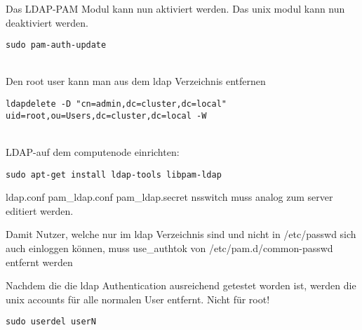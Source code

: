 Das LDAP-PAM Modul kann nun aktiviert werden. Das unix modul kann nun deaktiviert werden.
\begin{lstlisting}[style=Bash]
sudo pam-auth-update
\end{lstlisting}
\\
Den root user kann man aus dem ldap Verzeichnis entfernen
\begin{lstlisting}[style=Bash]
ldapdelete -D "cn=admin,dc=cluster,dc=local" uid=root,ou=Users,dc=cluster,dc=local -W
\end{lstlisting}
\\
LDAP-auf dem computenode einrichten:
\begin{lstlisting}[style=Bash]
sudo apt-get install ldap-tools libpam-ldap
\end{lstlisting}
{ldap.conf pam_ldap.conf pam_ldap.secret nsswitch} muss analog zum server editiert werden.

Damit Nutzer, welche nur im ldap Verzeichnis sind und nicht in /etc/passwd sich auch einloggen können, muss use_authtok von /etc/pam.d/common-passwd entfernt werden

Nachdem die die ldap Authentication ausreichend getestet worden ist, werden die unix accounts für alle normalen User entfernt. Nicht für root!
\begin{lstlisting}[style=Bash]
sudo userdel userN
\end{lstlisting}
